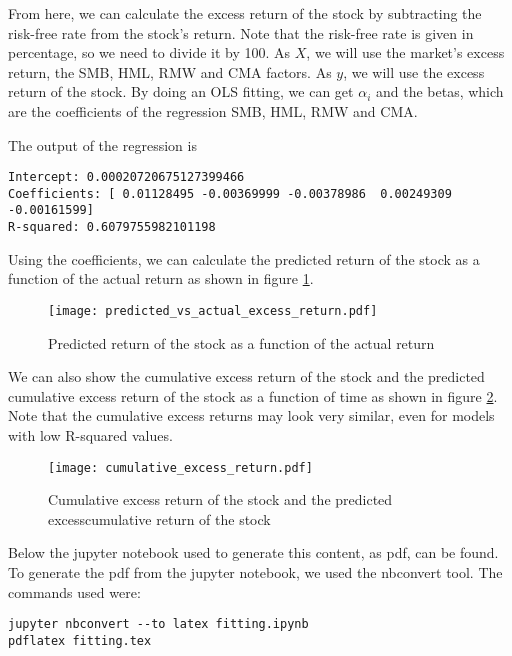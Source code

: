 \documentclass{article}
\begin{document}
From here, we can calculate the excess return of the stock by subtracting the risk-free rate from the stock's return.
Note that the risk-free rate is given in percentage, so we need to divide it by 100.
As $X$, we will use the market's excess return, the SMB, HML, RMW and CMA factors.
As $y$, we will use the excess return of the stock.
By doing an OLS fitting, we can get $\alpha_i$ and the betas,
which are the coefficients of the regression SMB, HML, RMW and CMA.

The output of the regression is
\footnotesize
\begin{verbatim}
Intercept: 0.00020720675127399466
Coefficients: [ 0.01128495 -0.00369999 -0.00378986  0.00249309 -0.00161599]
R-squared: 0.6079755982101198
\end{verbatim}
\normalsize

Using the coefficients, we can calculate the predicted return of the stock
as a function of the actual return as shown in
figure \ref{fig:predicted_return}.
\begin{figure}[ht]
    \centering
    \texttt{[image: predicted\_vs\_actual\_excess\_return.pdf]}
    \caption{Predicted return of the stock as a function of the actual return}
    \label{fig:predicted_return}
\end{figure}

We can also show the cumulative excess return of the stock and
the predicted cumulative excess return of the stock as a function of time as shown in
figure \ref{fig:cumulative_return}. Note that the cumulative excess returns
may look very similar, even for models with low R-squared values.

\begin{figure}[ht]
    \centering
    \texttt{[image: cumulative\_excess\_return.pdf]}
    \caption{Cumulative excess return of the stock and
        the predicted excesscumulative return of the stock}
    \label{fig:cumulative_return}
\end{figure}

Below the jupyter notebook used to generate this content, as pdf, can be found.
To generate the pdf from the jupyter notebook, we used the nbconvert tool.
The commands used were:
\begin{verbatim}
jupyter nbconvert --to latex fitting.ipynb
pdflatex fitting.tex
\end{verbatim}
\clearpage

\end{document}
